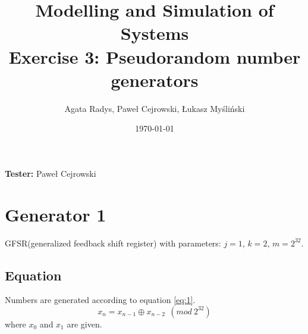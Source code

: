 \documentclass[a4paper,10pt]{article}
\title{Modelling and Simulation of Systems\\ \Large
Exercise 3: Pseudorandom number generators}
\author{Agata Radys, Paweł Cejrowski, Łukasz Myśliński}
\date{\today}
\begin{document}
\maketitle
\textbf{Tester:} Paweł Cejrowski



\section{Generator 1}

GFSR(generalized feedback shift register) with parameters: $j=1$, $k=2$, $m=2^{32}$.
\subsection{Equation}
Numbers are generated according to equation \ref{eq:1}.
\begin{equation}
\label{eq:1}
  x_n = x_{n-1} \oplus x_{n-2}\ \ (mod\ 2^{32})
\end{equation}
where ${x_0}$ and ${x_1}$ are given.
\end{document}
